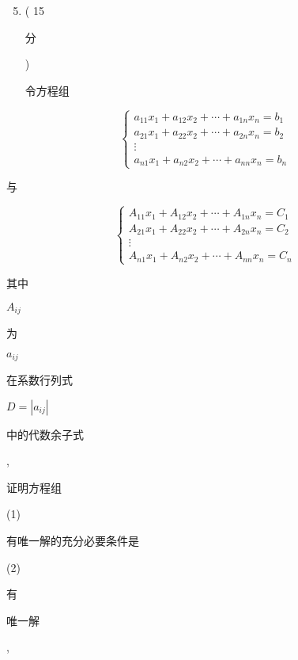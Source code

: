 \documentclass[10pt]{article}
\begin{document}
\begin{enumerate}
  \setcounter{enumi}{4}
  \item ( 15 \begin{CJK}{UTF8}{mj}分\end{CJK}) \begin{CJK}{UTF8}{mj}令方程组\end{CJK}
\end{enumerate}
$$
\left\{\begin{array}{l}
a_{11} x_{1}+a_{12} x_{2}+\cdots+a_{1 n} x_{n}=b_{1} \\
a_{21} x_{1}+a_{22} x_{2}+\cdots+a_{2 n} x_{n}=b_{2} \\
\vdots \\
a_{n 1} x_{1}+a_{n 2} x_{2}+\cdots+a_{n n} x_{n}=b_{n}
\end{array}\right.
$$
\begin{CJK}{UTF8}{mj}与\end{CJK}
$$
\left\{\begin{array}{l}
A_{11} x_{1}+A_{12} x_{2}+\cdots+A_{1 n} x_{n}=C_{1} \\
A_{21} x_{1}+A_{22} x_{2}+\cdots+A_{2 n} x_{n}=C_{2} \\
\vdots \\
A_{n 1} x_{1}+A_{n 2} x_{2}+\cdots+A_{n n} x_{n}=C_{n}
\end{array}\right.
$$
\begin{CJK}{UTF8}{mj}其中\end{CJK} $A_{i j}$ \begin{CJK}{UTF8}{mj}为\end{CJK} $a_{i j}$ \begin{CJK}{UTF8}{mj}在系数行列式\end{CJK} $D=\left|a_{i j}\right|$ \begin{CJK}{UTF8}{mj}中的代数余子式\end{CJK}, \begin{CJK}{UTF8}{mj}证明方程组\end{CJK} (1) \begin{CJK}{UTF8}{mj}有唯一解的充分必要条件是\end{CJK} (2) \begin{CJK}{UTF8}{mj}有\end{CJK} \begin{CJK}{UTF8}{mj}唯一解\end{CJK},
\end{document}
